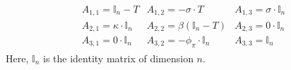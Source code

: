 \documentclass[11pt]{article}
\begin{document}
\begin{singlespace}
		\begin{align*}
		\begin{array}{lll}
		A_{1,1} = \mathbb{I}_n - T&
		A_{1,2} = -\sigma\cdot T& 
		A_{1,3} = \sigma\cdot\mathbb{I}_n\\
		A_{2,1} = \kappa\cdot\mathbb{I}_n&
		A_{2,2} = \beta (\mathbb{I}_n - T)& 
		A_{2,3} = 0\cdot \mathbb{I}_n\\
		A_{3,1} = 0\cdot \mathbb{I}_n& 
		A_{3,2} = -\phi_{\pi}\cdot \mathbb{I}_n&
		A_{3,3} = \mathbb{I}_n
		\end{array}
		\end{align*}
		Here, $\mathbb{I}_n$ is the identity matrix of dimension $n$.
		

\end{singlespace}
\end{document}
